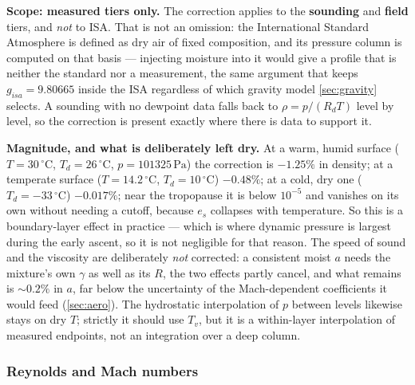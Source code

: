 {\textbf{Scope: measured tiers only.} The correction applies to the \textbf{sounding} and
\textbf{field} tiers, and \emph{not} to ISA. That is not an omission: the International Standard
Atmosphere is defined as dry air of fixed composition, and its pressure column is computed on
that basis --- injecting moisture into it would give a profile that is neither the standard nor
a measurement, the same argument that keeps $g_{isa} = 9.80665$ inside the ISA regardless of
which gravity model \autoref{sec:gravity} selects. A sounding with no dewpoint data falls back
to $\rho = p/(R_dT)$ level by level, so the correction is present exactly where there is data to
support it.

\textbf{Magnitude, and what is deliberately left dry.} At a warm, humid surface
($T = 30\,^\circ\mathrm{C}$, $T_d = 26\,^\circ\mathrm{C}$, $p = 101325\,\mathrm{Pa}$) the
correction is $-1.25\%$ in density; at a temperate surface
($T = 14.2\,^\circ\mathrm{C}$, $T_d = 10\,^\circ\mathrm{C}$) $-0.48\%$; at a cold, dry one
($T_d = -33\,^\circ\mathrm{C}$) $-0.017\%$; near the tropopause it is below $10^{-5}$ and
vanishes on its own without needing a cutoff, because $e_s$ collapses with temperature. So this
is a boundary-layer effect in practice --- which is where dynamic pressure is largest during the
early ascent, so it is not negligible for that reason. The speed of sound and the viscosity are
deliberately \emph{not} corrected: a consistent moist $a$ needs the mixture's own $\gamma$ as
well as its $R$, the two effects partly cancel, and what remains is $\sim0.2\%$ in $a$, far
below the uncertainty of the Mach-dependent coefficients it would feed
(\autoref{sec:aero}). The hydrostatic interpolation of $p$ between levels likewise stays on
dry $T$; strictly it should use $T_v$, but it is a within-layer interpolation of measured
endpoints, not an integration over a deep column.}

\subsubsection{Reynolds and Mach numbers}\label{sec:reynolds_mach}

